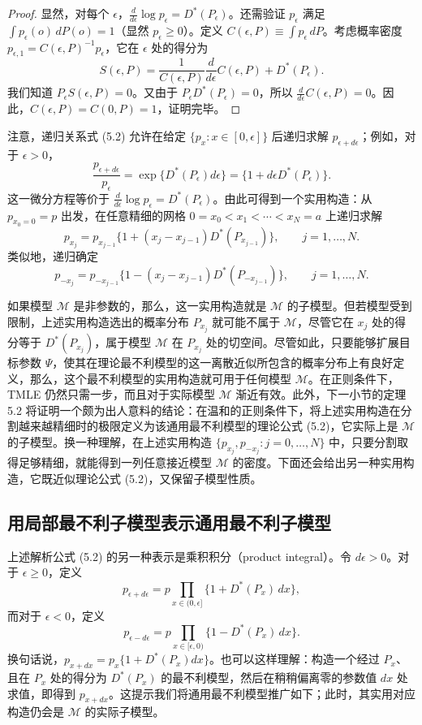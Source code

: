 \begin{proof}
显然，对每个 $\epsilon$，$\frac{d}{d\epsilon}\log p_\epsilon=D^*(P_\epsilon)$。还需验证 $p_\epsilon$ 满足 $\int p_\epsilon(o)\,dP(o)=1$（显然 $p_\epsilon\geq0$）。定义 $C(\epsilon,P)\equiv\int p_\epsilon\,dP$。考虑概率密度 $p_{\epsilon,1}=C(\epsilon,P)^{-1}p_\epsilon$，它在 $\epsilon$ 处的得分为
\[
 S(\epsilon,P)=\frac{1}{C(\epsilon,P)}
 \frac{d}{d\epsilon}C(\epsilon,P)+D^*(P_\epsilon).
\]
我们知道 $P_\epsilon S(\epsilon,P)=0$。又由于 $P_\epsilon D^*(P_\epsilon)=0$，所以 $\frac{d}{d\epsilon}C(\epsilon,P)=0$。因此，$C(\epsilon,P)=C(0,P)=1$，证明完毕。
\end{proof}

注意，递归关系式 (5.2) 允许在给定 $\{p_x:x\in[0,\epsilon]\}$ 后递归求解 $p_{\epsilon+d\epsilon}$；例如，对于 $\epsilon>0$，
\[
 \frac{p_{\epsilon+d\epsilon}}{p_\epsilon}
 =\exp\{D^*(P_\epsilon)d\epsilon\}
 =\{1+d\epsilon D^*(P_\epsilon)\}.
\]
这一微分方程等价于 $\frac{d}{d\epsilon}\log p_\epsilon=D^*(P_\epsilon)$。由此可得到一个实用构造：从 $p_{x_0=0}=p$ 出发，在任意精细的网格 $0=x_0<x_1<\cdots<x_N=a$ 上递归求解
\[
 p_{x_j}=p_{x_{j-1}}
 \{1+(x_j-x_{j-1})D^*(P_{x_{j-1}})\},
 \qquad j=1,\ldots,N.
\]
类似地，递归确定
\[
 p_{-x_j}=p_{-x_{j-1}}
 \{1-(x_j-x_{j-1})D^*(P_{-x_{j-1}})\},
 \qquad j=1,\ldots,N.
\]

如果模型 $\mathcal M$ 是非参数的，那么，这一实用构造就是 $\mathcal M$ 的子模型。但若模型受到限制，上述实用构造选出的概率分布 $P_{x_j}$ 就可能不属于 $\mathcal M$，尽管它在 $x_j$ 处的得分等于 $D^*(P_{x_j})$，属于模型 $\mathcal M$ 在 $P_{x_j}$ 处的切空间。尽管如此，只要能够扩展目标参数 $\Psi$，使其在理论最不利模型的这一离散近似所包含的概率分布上有良好定义，那么，这个最不利模型的实用构造就可用于任何模型 $\mathcal M$。在正则条件下，TMLE 仍然只需一步，而且对于实际模型 $\mathcal M$ 渐近有效。此外，下一小节的定理 5.2 将证明一个颇为出人意料的结论：在温和的正则条件下，将上述实用构造在分割越来越精细时的极限定义为该通用最不利模型的理论公式 (5.2)，它实际上是 $\mathcal M$ 的子模型。换一种理解，在上述实用构造 $\{p_{x_j},p_{-x_j}:j=0,\ldots,N\}$ 中，只要分割取得足够精细，就能得到一列任意接近模型 $\mathcal M$ 的密度。下面还会给出另一种实用构造，它既近似理论公式 (5.2)，又保留子模型性质。

\subsection{用局部最不利子模型表示通用最不利子模型}

上述解析公式 (5.2) 的另一种表示是乘积积分（product integral）。令 $d\epsilon>0$。对于 $\epsilon\geq0$，定义
\[
 p_{\epsilon+d\epsilon}
 =p\prod_{x\in(0,\epsilon]}\{1+D^*(P_x)\,dx\},
\]
而对于 $\epsilon<0$，定义
\[
 p_{\epsilon-d\epsilon}
 =p\prod_{x\in[\epsilon,0)}\{1-D^*(P_x)\,dx\}.
\]
换句话说，$p_{x+dx}=p_x\{1+D^*(P_x)dx\}$。也可以这样理解：构造一个经过 $P_x$、且在 $P_x$ 处的得分为 $D^*(P_x)$ 的最不利模型，然后在稍稍偏离零的参数值 $dx$ 处求值，即得到 $p_{x+dx}$。这提示我们将通用最不利模型推广如下；此时，其实用对应构造仍会是 $\mathcal M$ 的实际子模型。

